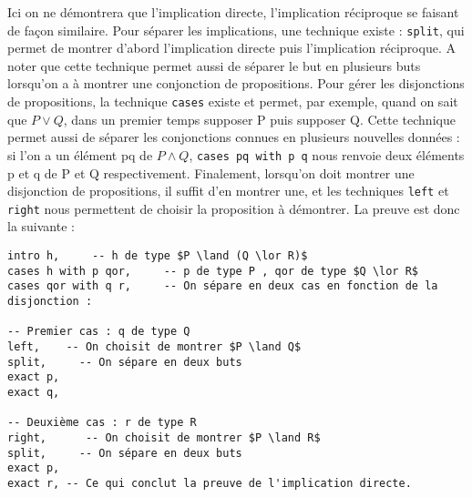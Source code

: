 Ici on ne démontrera que l'implication directe, l'implication réciproque se faisant de façon similaire.
Pour séparer les implications, une technique existe : \texttt{split}, qui permet de montrer d'abord l'implication directe puis l'implication réciproque. A noter que cette technique permet aussi de séparer le but en plusieurs buts lorsqu'on a à montrer une conjonction de propositions.
Pour gérer les disjonctions de propositions, la technique \texttt{cases} existe et permet, par exemple, quand on sait que $P\lor Q$, dans un premier temps supposer P puis supposer Q. Cette technique permet aussi de séparer les conjonctions connues en plusieurs nouvelles données : si l'on a un élément pq de $P\land Q$, \texttt{cases pq with p q} nous renvoie deux éléments p et q de P et Q respectivement.
Finalement, lorsqu'on doit montrer une disjonction de propositions, il suffit d'en montrer une, et les techniques \texttt{left} et \texttt{right} nous permettent de choisir la proposition à démontrer.
La preuve est donc la suivante : 
\begin{verbatim}
intro h,     -- h de type $P \land (Q \lor R)$
cases h with p qor,     -- p de type P , qor de type $Q \lor R$
cases qor with q r,     -- On sépare en deux cas en fonction de la disjonction :

-- Premier cas : q de type Q
left,    -- On choisit de montrer $P \land Q$
split,     -- On sépare en deux buts
exact p,
exact q,

-- Deuxième cas : r de type R
right,      -- On choisit de montrer $P \land R$
split,     -- On sépare en deux buts
exact p,
exact r, -- Ce qui conclut la preuve de l'implication directe.
\end{verbatim}
